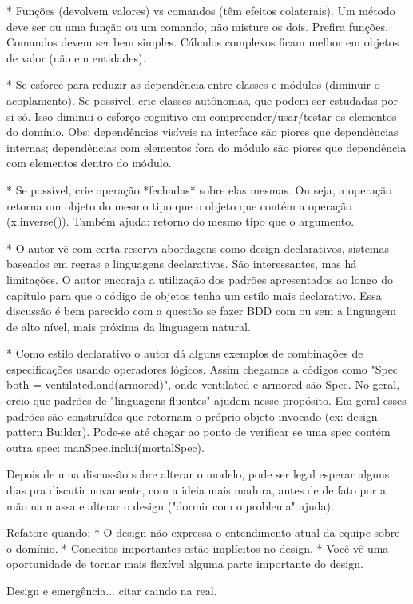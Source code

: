 \documentclass[a4paper, 12pt]{article}
\begin{document}
* Funções (devolvem valores) vs comandos (têm efeitos colaterais). Um método deve ser ou uma função ou um comando, não misture os dois. Prefira funções. Comandos devem ser bem simples. Cálculos complexos ficam melhor em objetos de valor (não em entidades).

* Se esforce para reduzir as dependência entre classes e módulos (diminuir o acoplamento). Se possível, crie classes autônomas, que podem ser estudadas por si só. Isso diminui o esforço cognitivo em compreender/usar/testar os elementos do domínio. Obs: dependências visíveis na interface são piores que dependências internas; dependências com elementos fora do módulo são piores que dependência com elementos dentro do módulo.

* Se possível, crie operação *fechadas* sobre elas mesmas. Ou seja, a operação retorna um objeto do mesmo tipo que o objeto que contém a operação (x.inverse()). Também ajuda: retorno do mesmo tipo que o argumento.

* O autor vê com certa reserva abordagens como design declarativos, sistemas baseados em regras e linguagens declarativas. São interessantes, mas há limitações. O autor encoraja a utilização dos padrões apresentados ao longo do capítulo para que o código de objetos tenha um estilo mais declarativo. Essa discussão é bem parecido com a questão se fazer BDD com ou sem a linguagem de alto nível, mais próxima da linguagem natural.

* Como estilo declarativo o autor dá alguns exemplos de combinações de especificações usando operadores lógicos. Assim chegamos a códigos como "Spec both = ventilated.and(armored)", onde ventilated e armored são Spec. No geral, creio que padrões de "linguagens fluentes" ajudem nesse propósito. Em geral esses padrões são construídos que retornam o próprio objeto invocado (ex: design pattern Builder). Pode-se até chegar ao ponto de verificar se uma spec contém outra spec: manSpec.inclui(mortalSpec).

Depois de uma discussão sobre alterar o modelo, pode ser legal esperar alguns dias pra discutir novamente, com a ideia mais madura, antes de de fato por a mão na massa e alterar o design ("dormir com o problema" ajuda).

Refatore quando:
* O design não expressa o entendimento atual da equipe sobre o domínio.
* Conceitos importantes estão implícitos no design.
* Você vê uma oportunidade de tornar mais flexível alguma parte importante do design.

Design e emergência... citar caindo na real.
\end{document}
